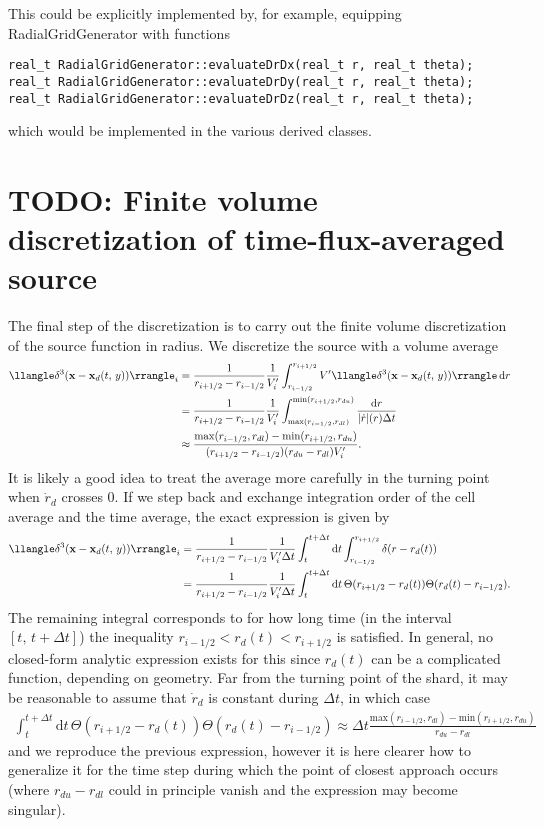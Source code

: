 \documentclass[11pt,a4paper]{article}
\newcommand{\rd}{\ensuremath{\mathrm{d}}}
\renewcommand{\b}[1]{\ensuremath{ {\bf #1 } }}
\begin{document}
This could be explicitly implemented by, for example, equipping RadialGridGenerator with functions
\begin{verbatim}
real_t RadialGridGenerator::evaluateDrDx(real_t r, real_t theta);
real_t RadialGridGenerator::evaluateDrDy(real_t r, real_t theta);
real_t RadialGridGenerator::evaluateDrDz(real_t r, real_t theta);
\end{verbatim}
which would be implemented in the various derived classes. 

\section*{TODO: Finite volume discretization of time-flux-averaged source}
The final step of the discretization is to carry out the finite volume discretization of the source function in radius. We discretize the source  with a volume average
\begin{align}
\llangle\delta^3( \b{x} - \b{x}_d(t,\,y)) \rrangle_i &= \frac{1}{r_{i+1/2} - r_{i-1/2}} \frac{1}{V'_i}\int_{r_{i-1/2}}^{r_{i+1/2}}V'\llangle\delta^3( \b{x} - \b{x}_d(t,\,y)) \rrangle  \, \rd r \nonumber \\
&= \frac{1}{r_{i+1/2} - r_{i-1/2}} \frac{1}{V'_i}\int_{\text{max}(r_{i-1/2},r_{dl})}^{\text{min}(r_{i+1/2},r_{du})}\frac{\rd r}{|\dot{r}|(r) \Delta t } \nonumber \\
&\approx \frac{\text{max}(r_{i-1/2},r_{dl})-\text{min}(r_{i+1/2},r_{du})}{(r_{i+1/2} - r_{i-1/2})(r_{du}-r_{dl})V'_i}.
\end{align}
It is likely a good idea to treat the average more carefully in the turning point when $\dot{r}_d$ crosses 0. If we step back and exchange integration order of the cell average and the time average, the exact expression is given by
\begin{align}
\llangle\delta^3( \b{x} - \b{x}_d(t,\,y)) \rrangle_i &= \frac{1}{r_{i+1/2} - r_{i-1/2}} \frac{1}{V'_i\Delta t}\int_t^{t+\Delta t}\rd t \int_{r_{i-1/2}}^{r_{i+1/2}}\delta(r-r_d(t)) \nonumber \\
&=\frac{1}{r_{i+1/2} - r_{i-1/2}} \frac{1}{V'_i\Delta t}\int_t^{t+\Delta t}\rd t \, \Theta(r_{i+1/2} - r_d(t)) \Theta(r_d(t)-r_{i-1/2}).
\end{align}
The remaining integral corresponds to for how long time (in the interval $[t,\,t+\Delta t]$) the inequality $r_{i-1/2} < r_d(t) < r_{i+1/2}$ is satisfied. In general, no closed-form analytic expression exists for this since $r_d(t)$ can be a complicated function, depending on geometry. Far from the turning point of the shard, it may be reasonable to assume that $\dot{r}_d$ is constant during $\Delta t$, in which case 
\begin{align}
\int_t^{t+\Delta t}\rd t \, \Theta(r_{i+1/2} - r_d(t)) \Theta(r_d(t)-r_{i-1/2}) \approx \Delta t \frac{\text{max}(r_{i-1/2},r_{dl})-\text{min}(r_{i+1/2},r_{du})}{r_{du}-r_{dl}}
\end{align}
and we reproduce the previous expression, however it is here clearer how to generalize it for the time step during which the point of closest approach occurs (where $r_{du}-r_{dl}$ could in principle vanish and the expression may become singular).
\end{document}
